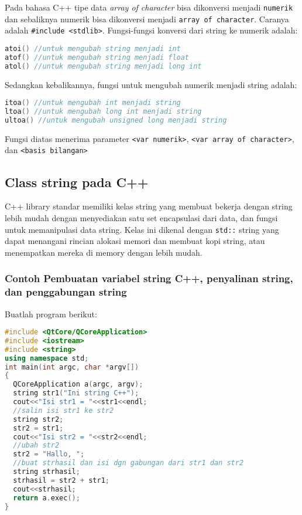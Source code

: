 Pada bahasa C++ tipe data \emph{array of character} bisa dikonversi
menjadi \texttt{numerik} dan sebaliknya numerik bisa dikonversi menjadi
\texttt{array\ of\ character}. Caranya adalah
\texttt{\#include\ \textless{}stdlib\textgreater{}}. Fungsi-fungsi
konversi dari string ke numerik adalah:

\begin{lstlisting}[language=c++, numbers=none]
atoi() //untuk mengubah string menjadi int
atof() //untuk mengubah string menjadi float
atol() //untuk mengubah string menjadi long int
\end{lstlisting}

Sedangkan kebalikannya, fungsi untuk mengubah numerik menjadi string
adalah:

\begin{lstlisting}[language=c++, numbers=none]
itoa() //untuk mengubah int menjadi string
ltoa() //untuk mengubah long int menjadi string
ultoa() //untuk mengubah unsigned long menjadi string
\end{lstlisting}

Fungsi diatas menerima parameter
\texttt{\textless{}var\ numerik\textgreater{}},
\texttt{\textless{}var\ array\ of\ character\textgreater{}}, dan
\texttt{\textless{}basis\ bilangan\textgreater{}}

\subsection{Class string pada C++}\label{class-string-pada-c}

C++ library standar memiliki kelas string yang membuat bekerja dengan
string lebih mudah dengan menyediakan satu set encapsulasi dari data,
dan fungsi untuk memanipulasi data string. Kelas ini dikenal dengan
\texttt{std::} string yang dapat menangani rincian alokasi memori dan
membuat kopi string, atau menempatkan mereka di memory dengan lebih
mudah.

\subsubsection*{Contoh  Pembuatan variabel string C++, penyalinan string, dan
penggabungan string}

Buatlah program berikut:

\begin{lstlisting}[language=c++, caption=Pembuatan variabel string C++ penyalinan string dan
penggabungan string, label=contoh3-25]
#include <QtCore/QCoreApplication>
#include <iostream>
#include <string>
using namespace std;
int main(int argc, char *argv[])
{
  QCoreApplication a(argc, argv);
  string str1("Ini string C++");
  cout<<"Isi str1 = "<<str1<<endl;
  //salin isi str1 ke str2
  string str2;
  str2 = str1;
  cout<<"Isi str2 = "<<str2<<endl;
  //ubah str2
  str2 = "Hallo, ";
  //buat strhasil dan isi dgn gabungan dari str1 dan str2
  string strhasil;
  strhasil = str2 + str1;
  cout<<strhasil;
  return a.exec();
}
\end{lstlisting}

